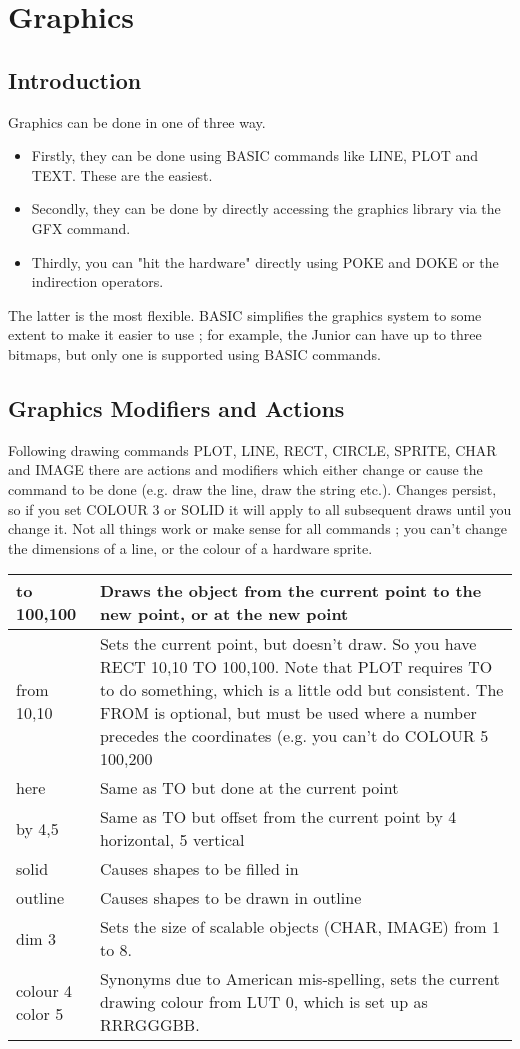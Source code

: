 \chapter{Graphics}

\section{Introduction}

Graphics can be done in one of three way. 

\begin{itemize}
\item Firstly, they can be done using BASIC commands like LINE, PLOT and TEXT. These are the easiest.
\item Secondly, they can be done by directly accessing the graphics library via the GFX command. 
\item Thirdly, you can "hit the hardware" directly using POKE and DOKE or the indirection operators.
\end{itemize}
The latter is the most flexible. BASIC simplifies the graphics system to some extent to make it easier to use ; for example, the Junior can have up to three bitmaps, but only one is supported using BASIC commands.

\section{Graphics Modifiers and Actions}
Following drawing commands PLOT, LINE, RECT, CIRCLE, SPRITE, CHAR and IMAGE there are actions and modifiers which either change or cause the command to be done (e.g. draw the line, draw the string etc.). 
Changes persist, so if you set COLOUR 3 or SOLID it will apply to all subsequent draws until you change it.
Not all things work or make sense for all commands ; you can’t change the dimensions of a line, or the colour of a hardware sprite.

\begin{tabular} {|p{1.0in}|p{4.5in}|}
\hline
to 100,100 & Draws the object from the current point to the new point, or at the new point \\
\hline
from 10,10 & Sets the current point, but doesn’t draw. So you have RECT 10,10 TO 100,100. Note that PLOT requires TO to do something, which is a little odd but consistent. The FROM is optional, but must be used where a number precedes the coordinates (e.g. you can’t do COLOUR 5 100,200 \\
\hline
here & Same as TO but done at the current point \\
\hline
by 4,5 & Same as TO but offset from the current point by 4 horizontal, 5 vertical \\
\hline
solid & Causes shapes to be filled in\\
\hline
outline & Causes shapes to be drawn in outline\\
\hline
dim 3 & Sets the size of scalable objects (CHAR, IMAGE) from 1 to 8.\\
\hline
colour 4 color 5 & Synonyms due to American mis-spelling, sets the current drawing colour from LUT 0, which is set up as  RRRGGGBB. \\
\hline
\end{tabular}

